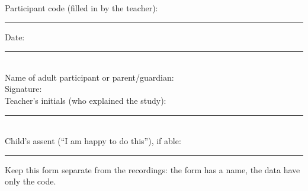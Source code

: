\documentclass[11pt,a4paper]{article}
\begin{document}
\vspace{6pt}
\newcommand{\line}[2]{\noindent #1 \hrulefill\hspace{1em}#2 \rule{4cm}{0.4pt}\\[12pt]}
\noindent Participant code (filled in by the teacher): \rule{3.5cm}{0.4pt}\hfill Date: \rule{4cm}{0.4pt}\\[12pt]
\noindent Name of adult participant or parent/guardian: \hrulefill\\[12pt]
\noindent Signature: \hrulefill\\[12pt]
\noindent Teacher's initials (who explained the study): \rule{3cm}{0.4pt}\\[12pt]
\noindent Child's assent (``I am happy to do this''), if able: \rule{4cm}{0.4pt}

\vspace{4pt}\footnotesize Keep this form separate from the recordings: the form has a name, the data have only the code.
\end{document}
